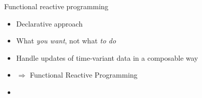 \documentclass{beamer}
\begin{document}
    \begin{frame}{Functional reactive programming}
        \begin{itemize}
            \item<alert@+> Declarative approach
            \item<alert@+> What \textit{you want}, not what \textit{to do}
            \item<alert@+> Handle updates of time-variant data in a composable way
            \item<+- | alert@+> \(\Rightarrow\) Functional Reactive Programming %
            \item \inputminted{haskell}{Example.hs}
        \end{itemize}
    \end{frame}
    
    
\end{document}
